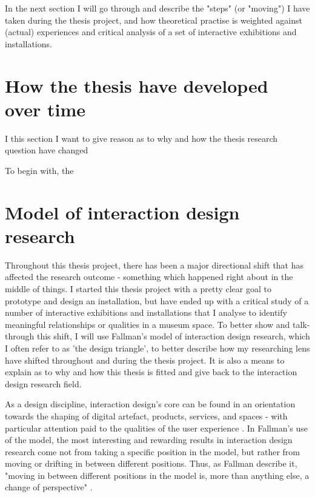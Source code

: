 In the next section I will go through and describe the "steps" (or "moving") I have taken during the thesis project, and how theoretical practise is weighted against (actual) experiences and critical analysis of a set of interactive exhibitions and installations.


\section{How the thesis have developed over time}

I this section I want to give reason as to why and how the thesis research question have changed 




To begin with, the

\section{Model of interaction design research}
Throughout this thesis project, there has been a major directional shift that has affected the research outcome - something which happened right about in the middle of things. I started this thesis project with a pretty clear goal to prototype and design an installation, but have ended up with a critical study of a number of interactive exhibitions and installations that I analyse to identify meaningful relationships or qualities in a museum space. To better show and talk-through this shift, I will use Fallman's model of interaction design research, which I often refer to as 'the design triangle', to better describe how my researching lens have shifted throughout and during the thesis project. It is also a means to explain as to why and how this thesis is fitted and give back to the interaction design research field.

As a design discipline, interaction design’s core can be found in an orientation towards the shaping of digital artefact, products, services, and spaces - with particular attention paid to the qualities of the user experience \autocite[p. 4]{fallman_triangle_2008}. In Fallman’s use of the model, the most interesting and rewarding results in interaction design research come not from taking a specific position in the model, but rather from moving or drifting in between different positions. Thus, as Fallman describe it, "moving in between different positions in the model is, more than anything else, a change of perspective" \autocite[p. 10]{fallman_triangle_2008}.



